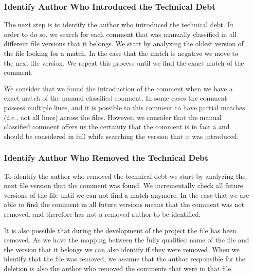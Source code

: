 \subsubsection*{Identify Author Who Introduced the Technical Debt}
\label{subsub:identify_author_who_introduced_the_technical_debt}

The next step is to identify the author who introduced the technical debt. In order to do so, we search for each \SATD comment that was manually classified in all different file versions that it belongs. We start by analyzing the oldest version of the \SATD file looking for a match. In the case that the match is negative we move to the next \SATD file version. We repeat this process until we find the exact match of the \SATD comment. 

We consider that we found the introduction of the \SATD comment when we have a exact match of the manual classified \SATD comment. In some cases the \SATD comment possess multiple lines, and it is possible to this comment to have partial matches (\textit{i.e.,} not all lines) across the files. However, we consider that the manual classified \SATD comment offers us the certainty that the comment is in fact a \SATD and should be considered in full while searching the version that it was introduced.

\subsubsection*{Identify Author Who Removed the Technical Debt}
\label{subsub:identify_author_who_removed_the_technical_debt}

To identify the author who removed the technical debt we start by analyzing the next file version that the \SATD comment was found. We incrementally check all future versions of the file until we can not find a match anymore. In the case that we are able to find the \SATD comment in all future versions means that the \SATD comment was not removed, and therefore has not a removed author to be identified. 

It is also possible that during the development of the project the \SATD file has been removed. As we have the mapping between the fully qualified name of the file and the version that it belongs we can also identify if they were removed. When we identify that the file was removed, we assume that the author responsible for the deletion is also the author who removed the \SATD comments that were in that file.

